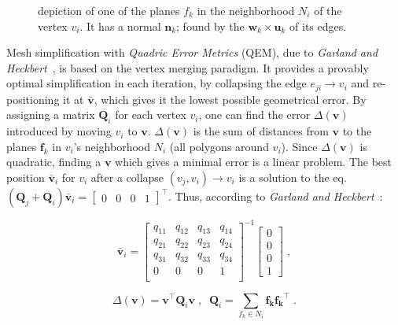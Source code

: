 \begin{figure}[h]
\begin{minipage}{0.485\textwidth}
        \caption{depiction of one of the planes \(f_k\) in the neighborhood \(N_i\) of the vertex \(v_i\). It has a normal \(\mathbf{n}_k\); found by the \(\mathbf{w}_k \times \mathbf{u}_k\) of its edges.}
        \label{fig:quadrics}
    \end{minipage}
\end{figure}

\vspace{-0.7em}

Mesh simplification with \emph{Quadric Error Metrics} (QEM), due to \emph{Garland and Heckbert}~\cite{garland1998simplifying}, is based on the vertex merging paradigm. It provides a provably optimal simplification in each iteration, by collapsing the edge \(e_{ji} \rightarrow v_i\) and re-positioning it at \(\mathbf{\bar{v}}\), which gives it the lowest possible geometrical error. By assigning a matrix \(\mathbf{Q}_i\) for each vertex \(v_i\), one can find the error \(\Delta(\mathbf{v})\) introduced by moving \(v_i\) to \(\mathbf{v}\). \(\Delta(\mathbf{v})\) is the sum of distances from \(\mathbf{v}\) to the planes \(\mathbf{f}_k\) in \(v_i\)'s neighborhood \(N_i\) (all polygons around \(v_i\)). Since \(\Delta(\mathbf{v})\) is quadratic, finding a \(\mathbf{v}\) which gives a minimal error is a linear problem. The best position \(\mathbf{\bar{v}}_i\) for \(v_i\) after a collapse \((v_j, v_i) \rightarrow v_i\) is a solution to the eq. \((\mathbf{Q}_j + \mathbf{Q}_i)\mathbf{\bar{v}}_i = \begin{bmatrix} 0 & 0 & 0 & 1 \end{bmatrix}^\intercal\). Thus, according to \emph{Garland and Heckbert}~\cite{garland1998simplifying}:

\[\bar{\mathbf{v}}_i = \begin{bmatrix}
    q_{11} & q_{12} & q_{13} & q_{14}\\
    q_{21} & q_{22} & q_{23} & q_{24}\\
    q_{31} & q_{32} & q_{33} & q_{34}\\
    0 & 0 & 0 & 1\\
\end{bmatrix}^{-1} \begin{bmatrix} 0 \\
                                   0 \\
                                   0 \\
                                   1 \end{bmatrix} \; ,\]

\[\Delta(\mathbf{v}) = \mathbf{v}^\intercal \mathbf{Q}_i  \mathbf{v} \;,\;\; \mathbf{Q}_i = \sum_{f_k \in N_i}  \mathbf{f_k} \mathbf{f_k}^\intercal \; .\]

